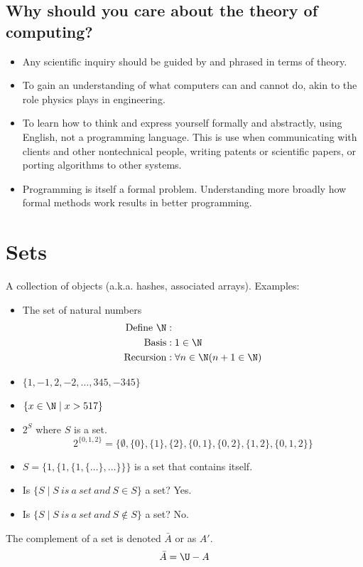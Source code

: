 \documentclass[letterpaper, 12pt]{math}
\begin{document}
\subsection*{Why should you care about the theory of computing?}
\begin{itemize}
  \item Any scientific inquiry should be guided by and phrased in
    terms of theory.
  \item To gain an understanding of what computers can and cannot do, akin
    to the role physics plays in engineering.
  \item To learn how to think and express yourself formally and abstractly,
    using English, not a programming language. This is use when communicating
    with clients and other nontechnical people, writing patents or scientific
    papers, or porting algorithms to other systems.
  \item Programming is itself a formal problem. Understanding more broadly how
    formal methods work results in better programming.
\end{itemize}

\section*{Sets}
A collection of objects (a.k.a. hashes, associated arrays). Examples:
\begin{itemize}
  \item The set of natural numbers
  \begin{align*}
    \mathrm{Define}\ \N&: \\
    \mathrm{Basis}&: 1\in\N \\
    \mathrm{Recursion}&: \forall n\in\N(n+1\in\N)
  \end{align*}
  \item \( \{1,-1,2,-2,\dots,345,-345\} \)
  \item \( \{x\in\N\mid x>517\} \)
  \item \( 2^{S} \) where \( S \) is a set.
    \[ 2^{\{0,1,2\}} = \{\emptyset,\{0\},\{1\},\{2\},\{0,1\},
      \{0,2\},\{1,2\},\{0,1,2\}\} \]
  \item \( S = \{1,\{1,\{1,\{\dots\},\dots\}\}\} \) is a set that
    contains itself.
  \item Is \( \{S\mid S\ is\ a\ set\ and\ S\in S\} \) a set? Yes.
  \item Is \( \{S\mid S\ is\ a\ set\ and\ S\notin S\} \) a set? No.
\end{itemize}
The complement of a set is denoted \( \bar{A} \) or as \( A' \).
\[ \bar{A} = \U-A \]
\end{document}
